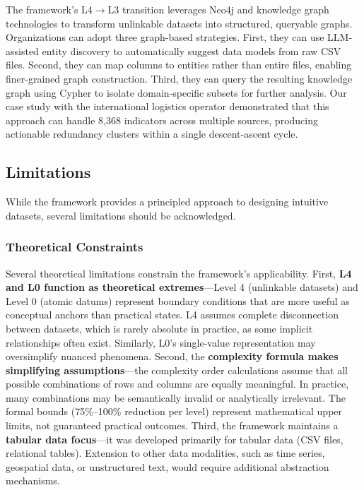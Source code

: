 \documentclass[12pt,a4paper]{article}
\begin{document}
The framework's L4$\to$L3 transition leverages Neo4j and knowledge graph technologies to transform unlinkable datasets into structured, queryable graphs. Organizations can adopt three graph-based strategies. First, they can use LLM-assisted entity discovery to automatically suggest data models from raw CSV files. Second, they can map columns to entities rather than entire files, enabling finer-grained graph construction. Third, they can query the resulting knowledge graph using Cypher to isolate domain-specific subsets for further analysis. Our case study with the international logistics operator demonstrated that this approach can handle 8,368 indicators across multiple sources, producing actionable redundancy clusters within a single descent-ascent cycle.

\subsection{Limitations}



While the framework provides a principled approach to designing intuitive datasets, several limitations should be acknowledged.

\subsubsection{Theoretical Constraints}

Several theoretical limitations constrain the framework's applicability. First, \textbf{L4 and L0 function as theoretical extremes}---Level 4 (unlinkable datasets) and Level 0 (atomic datums) represent boundary conditions that are more useful as conceptual anchors than practical states. L4 assumes complete disconnection between datasets, which is rarely absolute in practice, as some implicit relationships often exist. Similarly, L0's single-value representation may oversimplify nuanced phenomena. Second, the \textbf{complexity formula makes simplifying assumptions}---the complexity order calculations assume that all possible combinations of rows and columns are equally meaningful. In practice, many combinations may be semantically invalid or analytically irrelevant. The formal bounds (75\%--100\% reduction per level) represent mathematical upper limits, not guaranteed practical outcomes. Third, the framework maintains a \textbf{tabular data focus}---it was developed primarily for tabular data (CSV files, relational tables). Extension to other data modalities, such as time series, geospatial data, or unstructured text, would require additional abstraction mechanisms.
\end{document}

